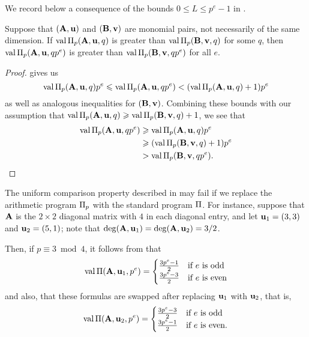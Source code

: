 \documentclass{article}
\begin{document}
We record below a consequence of the bounds $0 \le L \leq p^e-1$ in .

\begin{corollary}
   \label{cor: mu comparison}
   Suppose that $(\mathbf{A},\mathbf{u})$ and $(\mathbf{B},\mathbf{v})$ are monomial pairs, not necessarily of the same dimension.
   If $\operatorname{val} \Pi_p(\mathbf{A}, \mathbf{u}, q)$ is greater than $\operatorname{val} \Pi_p(\mathbf{B}, \mathbf{v}, q)$ for some $q$, then $\operatorname{val} \Pi_p(\mathbf{A}, \mathbf{u}, qp^e)$ is greater than $\operatorname{val} \Pi_p(\mathbf{B}, \mathbf{v}, qp^e)$ for all $e$.
\end{corollary}

\begin{proof}
    gives us
   \[
      \operatorname{val} \Pi_p(\mathbf{A}, \mathbf{u},q)p^e \leqslant \operatorname{val} \Pi_p(\mathbf{A}, \mathbf{u}, qp^e) < (\operatorname{val} \Pi_p(\mathbf{A}, \mathbf{u}, q)+1)p^e
   \]
   as well as analogous inequalities for $(\mathbf{B},\mathbf{v})$.
   Combining these bounds with our assumption that $\operatorname{val} \Pi_p(\mathbf{A}, \mathbf{u}, q) \geqslant \operatorname{val} \Pi_p(\mathbf{B}, \mathbf{v}, q) + 1$, we see that
   \begin{align*}
     \operatorname{val} \Pi_p(\mathbf{A}, \mathbf{u}, qp^e)  &\geqslant \operatorname{val} \Pi_p(\mathbf{A}, \mathbf{u}, q)  p^e \\
                                  &\geqslant (\operatorname{val} \Pi_p(\mathbf{B}, \mathbf{v}, q)+1) p^e \\
                                  & > \operatorname{val} \Pi_p(\mathbf{B}, \mathbf{v}, qp^e). \qedhere
   \end{align*}
\end{proof}

\begin{example}
\label{max depends on p and e: E}  The uniform comparison property described in  may fail if we replace the arithmetic program $\Pi_p$ with the standard program $\Pi$.  For instance, suppose that $\mathbf{A}$ is the $2 \times 2$ diagonal matrix with $4$ in each diagonal entry, and let $\mathbf{u}_1=(3,3)$ and $\mathbf{u}_2=(5,1)$;  note that $\operatorname{deg}(\mathbf{A},\mathbf{u}_1) = \operatorname{deg}(\mathbf{A},\mathbf{u}_2) = 3/2$.

Then, if $p \equiv 3 \bmod 4$, it follows from   that
\[
\operatorname{val}\Pi(\mathbf{A}, \mathbf{u}_1, p^e) = \begin{cases}
\frac{3 p^e - 1}{2} & \text{if } e \text{ is odd} \\
\frac{3 p^e - 3}{2} & \text{if } e \text{ is even}
\end{cases}
\]
and also, that these formulas are swapped after replacing $\mathbf{u}_1$ with $\mathbf{u}_2$, that is, 
\[
\operatorname{val}\Pi(\mathbf{A}, \mathbf{u}_2, p^e) = \begin{cases}
\frac{3 p^e - 3}{2} & \text{if } e \text{ is odd} \\ 
\frac{3 p^e - 1}{2} & \text{if } e \text{ is even}.
\end{cases}
\]
\end{example}
\end{document}
